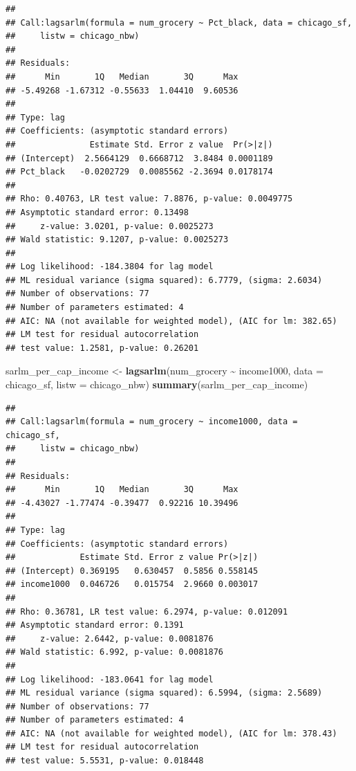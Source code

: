 \documentclass[
]{article}
\newenvironment{Shaded}{\begin{snugshade}}{\end{snugshade}}
\newcommand{\AttributeTok}[1]{\textcolor[rgb]{0.13,0.29,0.53}{#1}}
\newcommand{\FunctionTok}[1]{\textcolor[rgb]{0.13,0.29,0.53}{\textbf{#1}}}
\newcommand{\NormalTok}[1]{#1}
\newcommand{\OtherTok}[1]{\textcolor[rgb]{0.56,0.35,0.01}{#1}}
\newcommand{\SpecialCharTok}[1]{\textcolor[rgb]{0.81,0.36,0.00}{\textbf{#1}}}
\begin{document}
\begin{verbatim}
## 
## Call:lagsarlm(formula = num_grocery ~ Pct_black, data = chicago_sf, 
##     listw = chicago_nbw)
## 
## Residuals:
##      Min       1Q   Median       3Q      Max 
## -5.49268 -1.67312 -0.55633  1.04410  9.60536 
## 
## Type: lag 
## Coefficients: (asymptotic standard errors) 
##               Estimate Std. Error z value  Pr(>|z|)
## (Intercept)  2.5664129  0.6668712  3.8484 0.0001189
## Pct_black   -0.0202729  0.0085562 -2.3694 0.0178174
## 
## Rho: 0.40763, LR test value: 7.8876, p-value: 0.0049775
## Asymptotic standard error: 0.13498
##     z-value: 3.0201, p-value: 0.0025273
## Wald statistic: 9.1207, p-value: 0.0025273
## 
## Log likelihood: -184.3804 for lag model
## ML residual variance (sigma squared): 6.7779, (sigma: 2.6034)
## Number of observations: 77 
## Number of parameters estimated: 4 
## AIC: NA (not available for weighted model), (AIC for lm: 382.65)
## LM test for residual autocorrelation
## test value: 1.2581, p-value: 0.26201
\end{verbatim}

\begin{Shaded}
\begin{Highlighting}[]
\NormalTok{sarlm\_per\_cap\_income }\OtherTok{\textless{}{-}} \FunctionTok{lagsarlm}\NormalTok{(num\_grocery }\SpecialCharTok{\textasciitilde{}}\NormalTok{ income1000, }\AttributeTok{data =}\NormalTok{ chicago\_sf, }\AttributeTok{listw =}\NormalTok{ chicago\_nbw)}
\FunctionTok{summary}\NormalTok{(sarlm\_per\_cap\_income)}
\end{Highlighting}
\end{Shaded}

\begin{verbatim}
## 
## Call:lagsarlm(formula = num_grocery ~ income1000, data = chicago_sf, 
##     listw = chicago_nbw)
## 
## Residuals:
##      Min       1Q   Median       3Q      Max 
## -4.43027 -1.77474 -0.39477  0.92216 10.39496 
## 
## Type: lag 
## Coefficients: (asymptotic standard errors) 
##             Estimate Std. Error z value Pr(>|z|)
## (Intercept) 0.369195   0.630457  0.5856 0.558145
## income1000  0.046726   0.015754  2.9660 0.003017
## 
## Rho: 0.36781, LR test value: 6.2974, p-value: 0.012091
## Asymptotic standard error: 0.1391
##     z-value: 2.6442, p-value: 0.0081876
## Wald statistic: 6.992, p-value: 0.0081876
## 
## Log likelihood: -183.0641 for lag model
## ML residual variance (sigma squared): 6.5994, (sigma: 2.5689)
## Number of observations: 77 
## Number of parameters estimated: 4 
## AIC: NA (not available for weighted model), (AIC for lm: 378.43)
## LM test for residual autocorrelation
## test value: 5.5531, p-value: 0.018448
\end{verbatim}
\end{document}
